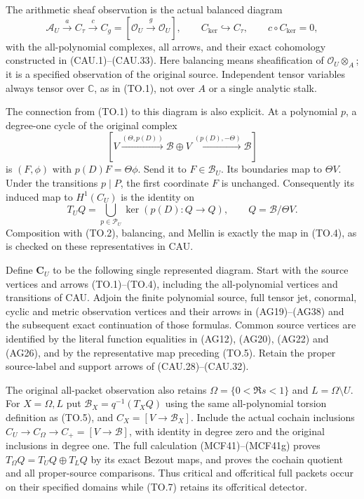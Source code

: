 The arithmetic sheaf observation is the actual balanced diagram
\[
 \mathcal A_U\xrightarrow a C_\tau\xrightarrow c
 C_g=[\mathcal O_U\xrightarrow{g}\mathcal O_U],
 \qquad C_{\ker}\hookrightarrow C_\tau,\qquad
 c\circ C_{\ker}=0,                                        \tag{TO.4}
\]
with the all-polynomial complexes, all arrows, and their exact
cohomology constructed in (CAU.1)--(CAU.33).  Here balancing means
sheafification of $\mathcal O_U\otimes_A$; it is a specified
observation of the original source.  Independent tensor variables
always tensor over $\mathbb C$, as in (TO.1), not over $A$ or a
single analytic stalk.

The connection from (TO.1) to this diagram is also explicit.  At a
polynomial $p$, a degree-one cycle of the original complex
\[
 [V\xrightarrow{(\Theta,p(D))}\mathscr B\oplus V
           \xrightarrow{(p(D),-\Theta)}\mathscr B]
\]
is $(F,\phi)$ with $p(D)F=\Theta\phi$.  Send it to $F\in\mathscr B_U$.
Its boundaries map to $\Theta V$.  Under the transitions $p\mid P$,
the first coordinate $F$ is unchanged.  Consequently its induced
map to $H^1(C_U)$ is the identity on
\[
 T_UQ=\bigcup_{p\in\mathcal P_U}\ker(p(D):Q\to Q),\qquad
 Q=\mathscr B/\Theta V.                                    \tag{TO.5}
\]
Composition with (TO.2), balancing, and Mellin is exactly the map
in (TO.4), as is checked on these representatives in CAU.

Define $\mathbf C_U$ to be the following single represented diagram.
Start with the source vertices and arrows (TO.1)--(TO.4), including
the all-polynomial vertices and transitions of CAU.  Adjoin the
finite polynomial source, full tensor jet, conormal, cyclic and
metric observation vertices and their arrows in (AG19)--(AG38)
and the subsequent exact continuation of those formulas.  Common
source vertices are identified by the literal function equalities
in (AG12), (AG20), (AG22) and (AG26), and by the representative
map preceding (TO.5).  Retain the proper source-label and support
arrows of (CAU.28)--(CAU.32).

The original all-packet observation also retains
$\Omega=\{0<\Re s<1\}$ and $L=\Omega\setminus U$.
For $X=\Omega,L$ put $\mathscr B_X=q^{-1}(T_XQ)$ using the
same all-polynomial torsion definition as (TO.5), and
$C_X=[V\to\mathscr B_X]$. Include the actual cochain inclusions
$C_U\to C_\Omega\to C_+=[V\to\mathscr B]$, with identity
in degree zero and the original inclusions in degree one.
The full calculation (MCF41)--(MCF41g) proves
$T_\Omega Q=T_UQ\oplus T_LQ$ by its exact Bezout maps,
and proves the cochain quotient and all proper-source comparisons.
Thus critical and offcritical full packets occur on their
specified domains while (TO.7) retains its offcritical detector.

